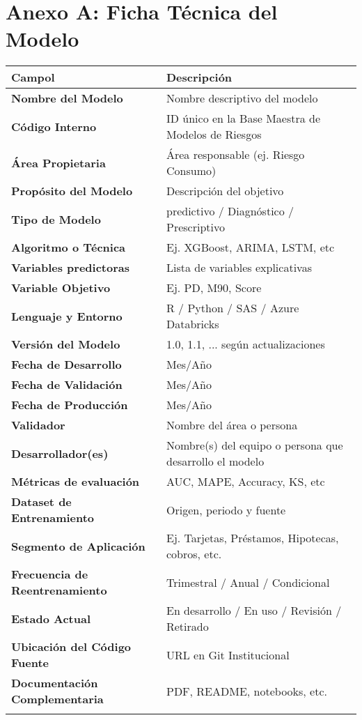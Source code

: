 \documentclass[11pt,oneside]{article}%
\begin{document}
\section{Anexo A: Ficha Técnica del Modelo}
\begin{longtable}{>{\bfseries}p{5cm}  p{10cm}}
\toprule
\rowcolor{ficoblue}
\color{white}\textbf{Campol}  & \color{white}\textbf{Descripción} \\
 \midrule
Nombre del Modelo              & Nombre descriptivo del modelo \\
\addlinespace
Código Interno                    & ID único en la Base Maestra de Modelos de Riesgos\\
\addlinespace
Área Propietaria                   & Área responsable (ej. Riesgo Consumo) \\ 
\addlinespace
Propósito del Modelo            & Descripción del objetivo \\
\addlinespace
Tipo de Modelo                   & predictivo / Diagnóstico / Prescriptivo \\ 
\addlinespace
Algoritmo o Técnica             & Ej. XGBoost, ARIMA, LSTM, etc \\
\addlinespace
Variables predictoras            & Lista de variables explicativas \\
\addlinespace
Variable Objetivo                 &  Ej. PD, M90, Score \\
\addlinespace
Lenguaje y Entorno             & R / Python / SAS / Azure Databricks \\
\addlinespace
Versión del Modelo              & 1.0, 1.1, ... según actualizaciones \\ 
\addlinespace 
Fecha de Desarrollo            & Mes/Año \\ 
\addlinespace
Fecha de Validación            & Mes/Año\\
\addlinespace 
Fecha de Producción          & Mes/Año\\
\addlinespace
Validador                          & Nombre del área o persona \\
\addlinespace   
Desarrollador(es)               &  Nombre(s) del equipo  o persona que desarrollo el modelo \\
\addlinespace
Métricas de evaluación       & AUC, MAPE, Accuracy, KS, etc \\ 
\addlinespace
Dataset de Entrenamiento  & Origen, periodo y fuente \\ 
\addlinespace
Segmento de Aplicación    & Ej. Tarjetas, Préstamos, Hipotecas, cobros, etc. \\
\addlinespace
  Frecuencia de Reentrenamiento & Trimestral / Anual / Condicional \\
\addlinespace
Estado Actual             & En desarrollo / En uso / Revisión / Retirado \\
\addlinespace
Ubicación del Código Fuente & URL en Git Institucional \\
\addlinespace
Documentación Complementaria & PDF, README, notebooks, etc.\\ 
\addlinespace
\bottomrule
\end{longtable}
\newpage
\end{document}
